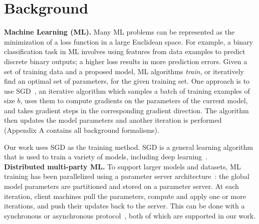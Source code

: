 \chapter{Background}
\label{sec:background}

\noindent \textbf{Machine Learning (ML).} 
%
Many ML problems can be represented as the minimization of a loss
function in a large Euclidean space. For example, a binary
classification task in ML involves using features from data examples to
predict discrete binary outputs; a higher loss results in more
prediction errors. Given a set of training data and a proposed model, ML
algorithms \emph{train}, or iteratively find an optimal set of
parameters, for the given training set. One approach is to use
\ac{SGD}~\cite{Bottou:2010}, an iterative
algorithm which samples a batch of training examples of size $b$, uses
them to compute gradients on the parameters of the current model, and
takes gradient steps in the corresponding gradient direction. The
algorithm then updates the model parameters and another iteration is
performed (Appendix A contains all background formalisms).

Our work uses SGD as the training method. SGD is a
general learning algorithm that is used to train a variety
of models, including deep learning~\cite{Song:2013}.\\

\noindent \textbf{Distributed multi-party ML.}
%
To support larger models and datasets, ML training has been
parallelized using a parameter server architecture~\cite{Li:2014}: the
global model parameters are partitioned and stored on a parameter
server. At each iteration, client machines pull the 
parameters, compute and apply one or more iterations, and push their
updates back to the server. This can be done
with a synchronous or asynchronous protocol~\cite{Hsieh:2017,
Recht:2011}, both of which are supported in our work.

